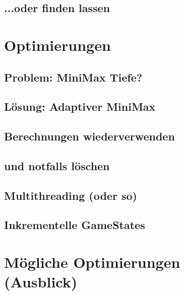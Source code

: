 \documentclass[12pt, draft]{beamer}
\begin{document}
\subsection{...oder finden lassen} \begin{frame}\end{frame}

\section{Optimierungen}
\subsection{Problem: MiniMax Tiefe?} \begin{frame}\end{frame}
\subsection{Lösung: Adaptiver MiniMax} \begin{frame}\end{frame}
\subsection{Berechnungen wiederverwenden} \begin{frame}\end{frame}
\subsection{und notfalls löschen} \begin{frame}\end{frame}
\subsection{Multithreading (oder so)} \begin{frame}\end{frame}
\subsection{Inkrementelle GameStates} \begin{frame}\end{frame}


\section{Mögliche Optimierungen (Ausblick)}
\end{document}
